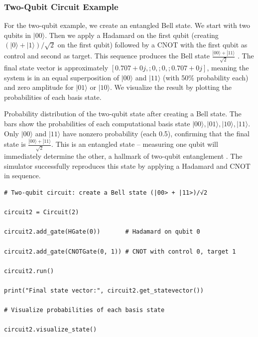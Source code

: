 \documentclass{beamer}
\begin{document}
\begin{frame}
\frametitle{Two-Qubit Circuit Example}

For the two-qubit example, we create an entangled Bell state. We start
with two qubits in $|00\rangle$. Then we apply a Hadamard on the first
qubit (creating $(|0\rangle+|1\rangle)/\sqrt{2}$ on the first qubit)
followed by a CNOT with the first qubit as control and second as
target. This sequence produces the Bell state
$\frac{|00\rangle + |11\rangle}{\sqrt{2}}$ . The final state vector is approximately
$[0.707+0j,;0,;0,;0.707+0j]$, meaning the system is in an equal
superposition of $|00\rangle$ and $|11\rangle$ (with 50\% probability
each) and zero amplitude for $|01\rangle$ or $|10\rangle$. We
visualize the result by plotting the probabilities of each basis
state.

Probability distribution of the two-qubit state after creating a Bell
state. The bars show the probabilities of each computational basis
state $|00\rangle,|01\rangle,|10\rangle,|11\rangle$. Only $|00\rangle$
and $|11\rangle$ have nonzero probability (each 0.5), confirming that
the final state is $\frac{|00\rangle + |11\rangle}{\sqrt{2}}$. This is
an entangled state – measuring one qubit will immediately determine
the other, a hallmark of two-qubit entanglement . The simulator
successfully reproduces this state by applying a Hadamard and CNOT in
sequence.

















\begin{verbatim}
# Two-qubit circuit: create a Bell state (|00> + |11>)/√2

circuit2 = Circuit(2)

circuit2.add_gate(HGate(0))       # Hadamard on qubit 0

circuit2.add_gate(CNOTGate(0, 1)) # CNOT with control 0, target 1

circuit2.run()

print("Final state vector:", circuit2.get_statevector())

# Visualize probabilities of each basis state

circuit2.visualize_state()

\end{verbatim}
\end{frame}
\end{document}
